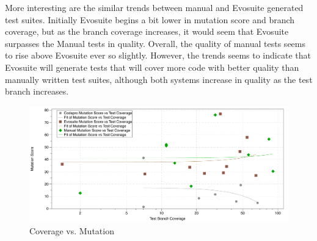 More interesting are the similar trends between manual and Evosuite generated test suites. Initially Evosuite begins a bit lower in mutation score and branch coverage, but as the branch coverage increases, it would seem that Evosuite surpasses the Manual tests in quality. Overall, the quality of manual tests seems to rise above Evosuite ever so slightly. However, the trends seems to indicate that Evosuite will generate tests that will cover more code with better quality than manually written test suites, although both systems increase in quality as the test branch increases.

\begin{figure}[!t]
\centering
  \includegraphics[width=\textwidth]{Coverage_Mutation}
    \caption{Coverage vs. Mutation}
  \label{fig:Coverage_Mutation}
\end{figure}
